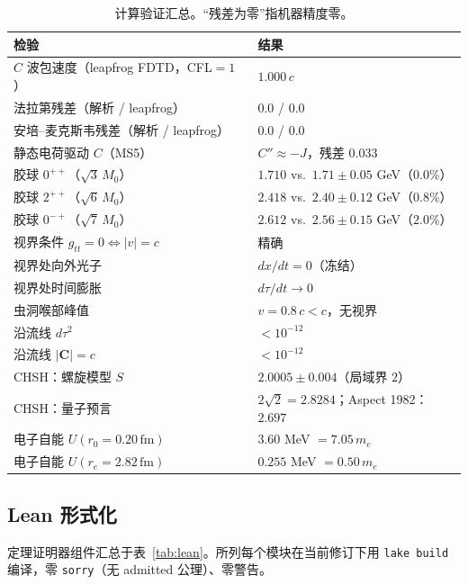 \documentclass[aps,prd,preprint,superscriptaddress,amsmath,amssymb]{revtex4-2}
\begin{document}
\begin{table}[h]
\caption{计算验证汇总。``残差为零''指机器精度零。}
\label{tab:validation}
\begin{ruledtabular}
\begin{tabular}{ll}
检验 & 结果 \\
\hline
$C$ 波包速度（leapfrog FDTD，CFL$=1$） & $1.000\,c$ \\
法拉第残差（解析 / leapfrog） & $0.0$ / $0.0$ \\
安培--麦克斯韦残差（解析 / leapfrog） & $0.0$ / $0.0$ \\
静态电荷驱动 $C$（MS5） & $C''\approx -J$，残差 $0.033$ \\
胶球 $0^{++}$（$\sqrt3\,M_0$） & $1.710$ vs.\ $1.71\pm0.05$ GeV（$0.0\%$） \\
胶球 $2^{++}$（$\sqrt6\,M_0$） & $2.418$ vs.\ $2.40\pm0.12$ GeV（$0.8\%$） \\
胶球 $0^{-+}$（$\sqrt7\,M_0$） & $2.612$ vs.\ $2.56\pm0.15$ GeV（$2.0\%$） \\
视界条件 $g_{tt}=0\Leftrightarrow|v|=c$ & 精确 \\
视界处向外光子 & $dx/dt=0$（冻结） \\
视界处时间膨胀 & $d\tau/dt\to 0$ \\
虫洞喉部峰值 & $v=0.8\,c<c$，无视界 \\
沿流线 $d\tau^2$ & $<10^{-12}$ \\
沿流线 $|\bm{C}|=c$ & $<10^{-12}$ \\
CHSH：螺旋模型 $S$ & $2.0005\pm0.004$（局域界 $2$） \\
CHSH：量子预言 & $2\sqrt2=2.8284$；Aspect 1982：$2.697$ \\
电子自能 $U(r_0=0.20\,\mathrm{fm})$ & $3.60$ MeV $=7.05\,m_e$ \\
电子自能 $U(r_e=2.82\,\mathrm{fm})$ & $0.255$ MeV $=0.50\,m_e$ \\
\end{tabular}
\end{ruledtabular}
\end{table}

\subsection{Lean 形式化}

定理证明器组件汇总于表~\ref{tab:lean}。所列每个模块在当前修订下用
\texttt{lake build} 编译，零 \texttt{sorry}（无 admitted 公理）、零警告。
\end{document}
